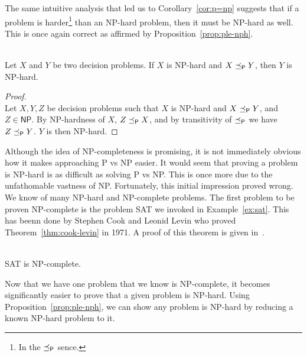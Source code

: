 The same intuitive analysis that led us to Corollary~\ref{cor:p=np} suggests that if a problem is harder\footnote{In the \(\preceq_\textsf{P}\) sence.} than an \textsf{NP}-hard problem, then it must be \textsf{NP}-hard as well. This is once again correct as affirmed by Proposition~\ref{prop:ple-nph}.

\begin{proposition}\ \\
    \label{prop:ple-nph}
    Let \(X\) and \(Y\) be two decision problems. If \(X\) is \textsf{NP}-hard and \(X\preceq_\textsf{P} Y\), then \(Y\) is \textsf{NP}-hard.
\end{proposition}

\begin{proof}\ \\
    Let \(X, Y, Z\) be decision problems such that \(X\) is \textsf{NP}-hard and \(X\preceq_\textsf{P} Y\), and \(Z \in\textsf{NP}\). By  \textsf{NP}-hardness of \(X\), \(Z \preceq_\textsf{P} X\), and by transitivity of \(\preceq_\textsf{P}\) we have \(Z \preceq_\textsf{P} Y\). \(Y\) is then \textsf{NP}-hard.
\end{proof}

Although the idea of \textsf{NP}-completeness is promising, it is not immediately obvious how it makes approaching \textsf{P} vs \textsf{NP} easier. It would seem that proving a problem is \textsf{NP}-hard is as difficult as solving \textsf{P} vs \textsf{NP}. This is once more due to the unfathomable vastness of \textsf{NP}. Fortunately, this initial impression proved wrong. We know of many \textsf{NP}-hard and \textsf{NP}-complete problems. The first problem to be proven \textsf{NP}-complete is the problem \textsf{SAT} we invoked in Example~\ref{ex:sat}. This has beenn done by Stephen Cook and Leonid Levin who proved Theorem~\ref{thm:cook-levin} in 1971. A proof of this theorem is given in~\cite{langages-formels}.

\begin{theorem}\ \\
    \label{thm:cook-levin}
    \textsf{SAT} is \textsf{NP}-complete.
\end{theorem}

Now that we have one problem that we know is \textsf{NP}-complete, it becomes significantly easier to prove that a given problem is \textsf{NP}-hard. Using Proposition~\ref{prop:ple-nph}, we can show any problem is \textsf{NP}-hard by reducing a known \textsf{NP}-hard problem to it.

